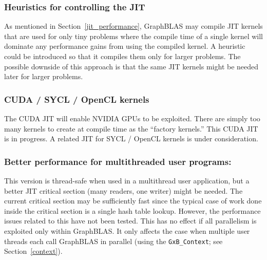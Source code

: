 \subsubsection{Heuristics for controlling the JIT}
As mentioned in Section~\ref{jit_performance}, GraphBLAS may compile JIT
kernels that are used for only tiny problems where the compile time of a single
kernel will dominate any performance gains from using the compiled kernel.  A
heuristic could be introduced so that it compiles them only for larger
problems.  The possible downside of this approach is that the same JIT kernels
might be needed later for larger problems.

\subsubsection{CUDA / SYCL / OpenCL kernels}
The CUDA JIT will enable NVIDIA GPUs to be exploited.  There are simply too
many kernels to create at compile time as the ``factory kernels.''  This CUDA
JIT is in progress.  A related JIT for SYCL / OpenCL kernels is under
consideration.

\subsubsection{Better performance for multithreaded user programs:}
This version is thread-safe when used in a multithread user application, but a
better JIT critical section (many readers, one writer) might be needed.  The
current critical section may be sufficiently fast since the typical case of
work done inside the critical section is a single hash table lookup.  However,
the performance issues related to this have not been tested.  This has no
effect if all parallelism is exploited only within GraphBLAS.  It only
affects the case when multiple user threads each call GraphBLAS in parallel
(using the \verb'GxB_Context'; see Section~\ref{context}).

